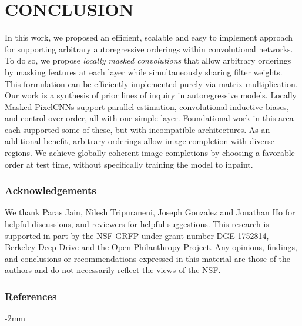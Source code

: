 \documentclass[letterpaper]{article}
\begin{document}
\section{CONCLUSION}
In this work, we proposed an efficient, scalable and easy to implement approach for supporting arbitrary autoregressive orderings within convolutional networks. To do so, we propose \textit{locally masked convolutions} that allow arbitrary orderings by masking features at each layer while simultaneously sharing filter weights. This formulation can be efficiently implemented purely via matrix multiplication. 
Our work is a synthesis of prior lines of inquiry in autoregressive models. Locally Masked PixelCNNs support parallel estimation, convolutional inductive biases, and control over order, all with one simple layer. Foundational work in this area each supported some of these, but with incompatible architectures.
As an additional benefit, arbitrary orderings allow image completion with diverse regions.
We achieve globally coherent image completions by choosing a favorable order at test time, without specifically training the model to inpaint.

\subsubsection*{Acknowledgements}
We thank Paras Jain, Nilesh Tripuraneni, Joseph Gonzalez and Jonathan Ho for helpful discussions, and reviewers for helpful suggestions. This research is supported in part by the NSF GRFP under grant number DGE-1752814, Berkeley Deep Drive and the Open Philanthropy Project. Any opinions, findings, and conclusions or recommendations expressed in this material are those of the authors and do not necessarily reflect the views of the NSF.

\clearpage
\nocite{gilbert}
\subsubsection*{References}
\begingroup
\small
\renewcommand{\section}[2]{} \setlength{\bibsep}{1pt}

\endgroup

\clearpage
\appendix
\section{APPENDIX}
\vspace{-2mm}
\end{document}
